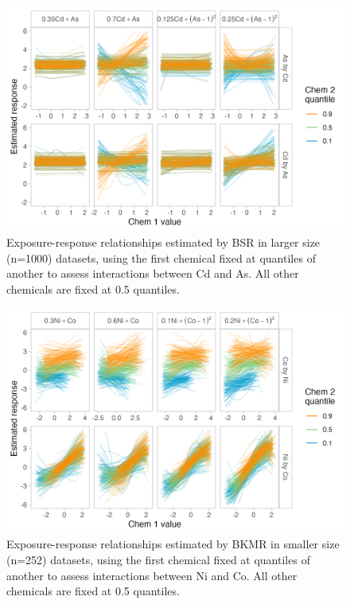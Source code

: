 \documentclass[12pt, twoside]{amherstthesis}
\begin{document}
\begin{figure}

{\centering \includegraphics[width=0.8\linewidth]{figures/ch4_slg_biv_expresp_2} 

}

\caption{Exposure-response relationships estimated by BSR in larger size (n=1000) datasets, using the first chemical fixed at quantiles of another to assess interactions between Cd and As. All other chemicals are fixed at 0.5 quantiles.}\label{fig:slgcdas}
\end{figure}
\begin{figure}

{\centering \includegraphics[width=0.8\linewidth]{figures/ch4_ksm_biv_expresp_3} 

}

\caption{Exposure-response relationships estimated by BKMR in smaller size (n=252) datasets, using the first chemical fixed at quantiles of another to assess interactions between Ni and Co. All other chemicals are fixed at 0.5 quantiles.}\label{fig:ksmnico}
\end{figure}
\end{document}
